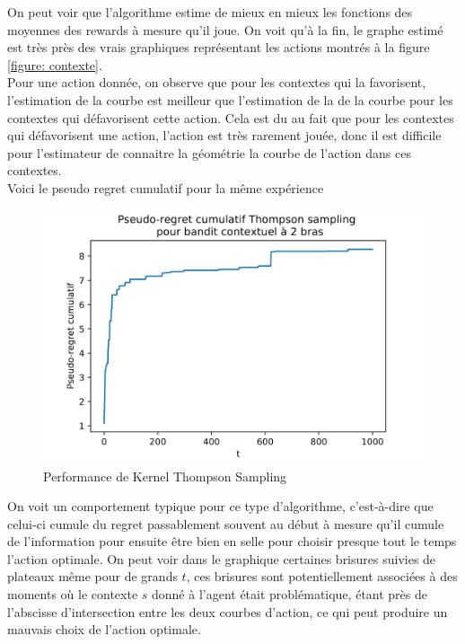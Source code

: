 \documentclass[letterpaper,11pt]{article}
\begin{document}
On peut voir que l'algorithme estime de mieux en mieux les fonctions des moyennes des rewards à mesure qu'il joue. On voit qu'à la fin, le graphe estimé est très près des vrais graphiques représentant les actions montrés à la figure \ref{figure: contexte}.\\

Pour une action donnée, on observe que pour les contextes qui la favorisent, l'estimation de la courbe est meilleur que l'estimation de la de la courbe pour les contextes qui défavorisent cette action. Cela est du au fait que pour les contextes qui défavorisent une action, l'action est très rarement jouée, donc il est difficile pour l'estimateur de connaitre la géométrie la courbe de l'action dans ces contextes.
\\

Voici le pseudo regret cumulatif pour la même expérience

\begin{figure}[H]
\label{figure: pseudo KTS}
\caption{Performance de Kernel Thompson Sampling}
\begin{center}
\includegraphics[scale=0.2]{pseudo-KTS.png}
\end{center}
\end{figure}

On voit un comportement typique pour ce type d'algorithme, c'est-à-dire que celui-ci cumule du regret passablement souvent au début à mesure qu'il cumule de l'information pour ensuite être bien en selle pour choisir presque tout le temps l'action optimale. On peut voir dans le graphique certaines brisures suivies de plateaux même pour de grands $t$, ces brisures sont potentiellement associées à des moments où le contexte $s$ donné à l'agent était problématique, étant près de l'abscisse d'intersection entre les deux courbes d'action, ce qui peut produire un mauvais choix de l'action optimale.
\end{document}
